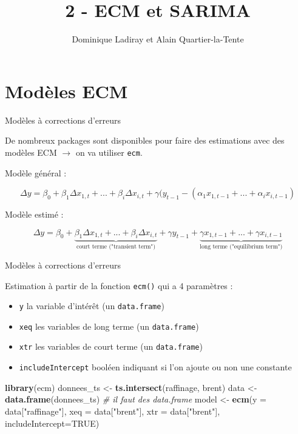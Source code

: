 \documentclass[10pt,xcolor=table,color={dvipsnames,usenames},ignorenonframetext,usepdftitle=false,french]{beamer}
\title{2 - ECM et SARIMA}
\author{Dominique Ladiray et Alain Quartier-la-Tente}
\date{}
\newenvironment{Shaded}{\begin{snugshade}}{\end{snugshade}}
\newcommand{\CommentTok}[1]{\textcolor[rgb]{0.56,0.35,0.01}{\textit{#1}}}
\newcommand{\DataTypeTok}[1]{\textcolor[rgb]{0.13,0.29,0.53}{#1}}
\newcommand{\KeywordTok}[1]{\textcolor[rgb]{0.13,0.29,0.53}{\textbf{#1}}}
\newcommand{\NormalTok}[1]{#1}
\newcommand{\OtherTok}[1]{\textcolor[rgb]{0.56,0.35,0.01}{#1}}
\newcommand{\StringTok}[1]{\textcolor[rgb]{0.31,0.60,0.02}{#1}}
\begin{document}

\hypertarget{moduxe8les-ecm}{%
\section{Modèles ECM}\label{moduxe8les-ecm}}

\begin{frame}[fragile]{Modèles à corrections d'erreurs}
\protect\hypertarget{moduxe8les-uxe0-corrections-derreurs}{}

De nombreux packages sont disponibles pour faire des estimations avec
des modèles ECM \(\rightarrow\) on va utiliser \texttt{ecm}.

Modèle général :

\[
\Delta y = \beta_{0} + \beta_{1}\Delta x_{1,t} +...+ \beta_{i}\Delta x_{i,t} + \gamma(y_{t-1} - (\alpha_{1}x_{1,t-1} +...+\alpha_{i}x_{i,t-1})
\]

Modèle estimé :

\[
\Delta y = \beta_{0} + \underbrace{\beta_{1}\Delta x_{1,t} +...+ \beta_{i}\Delta x_{i,t}}_{\text{court terme ("transient term")}} + \gamma y_{t-1} + \underbrace{\gamma x_{1,t-1} +...+ \gamma x_{i,t-1}}_{\text{long terme ("equilibrium term")}}
\]

\end{frame}

\begin{frame}[fragile]{Modèles à corrections d'erreurs}
\protect\hypertarget{moduxe8les-uxe0-corrections-derreurs-1}{}

Estimation à partir de la fonction \texttt{ecm()} qui a 4 paramètres :

\begin{itemize}
\item
  \texttt{y} la variable d'intérêt (un \texttt{data.frame})
\item
  \texttt{xeq} les variables de long terme (un \texttt{data.frame})
\item
  \texttt{xtr} les variables de court terme (un \texttt{data.frame})
\item
  \texttt{includeIntercept} booléen indiquant si l'on ajoute ou non une
  constante
\end{itemize}

\begin{Shaded}
\begin{Highlighting}[]
\KeywordTok{library}\NormalTok{(ecm)}
\NormalTok{donnees_ts <-}\StringTok{ }\KeywordTok{ts.intersect}\NormalTok{(raffinage, brent)}
\NormalTok{data <-}\StringTok{ }\KeywordTok{data.frame}\NormalTok{(donnees_ts) }\CommentTok{# il faut des data.frame}
\NormalTok{model <-}\StringTok{ }\KeywordTok{ecm}\NormalTok{(}\DataTypeTok{y =}\NormalTok{ data[}\StringTok{"raffinage"}\NormalTok{], }
             \DataTypeTok{xeq =}\NormalTok{ data[}\StringTok{"brent"}\NormalTok{],}
             \DataTypeTok{xtr =}\NormalTok{ data[}\StringTok{"brent"}\NormalTok{],}
             \DataTypeTok{includeIntercept=}\OtherTok{TRUE}\NormalTok{)}
\end{Highlighting}
\end{Shaded}

\end{frame}
\end{document}
